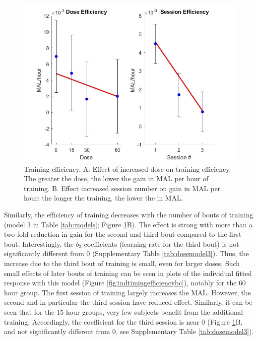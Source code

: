 \begin{figure}
	\centering
	\includegraphics[width=0.7\linewidth]{figures/doseEfficiency}
	\caption[Training efficiency.]{Training efficiency. 
		A. Effect of increased dose on training efficiency. The greater the dose, the lower the gain in MAL per hour of training. 
		B. Effect increased session number on gain in MAL per hour: the longer the training, the lower the in MAL.}
	\label{fig:doseefficiency}
\end{figure}


Similarly, the efficiency of training decreases with the number of bouts of training (model 3 in Table \ref{tab:models}; Figure \ref{fig:doseefficiency}B). 
The effect is strong with more than a two-fold reduction in gain for the second and third bout compared to the first bout. 
Interestingly, the $ b_3 $ coefficients (learning rate for the third bout) is not significantly different from 0 (Supplementary Table \ref{tab:dosemodel3}). 
Thus, the increase due to the third bout of training is small, even for larger doses. 
Such small effects of later bouts of training can be seen in plots of the individual fitted response with this model (Figure \ref{fig:indtimingefficiencybc}), notably for the 60 hour group. 
The first session of training largely increases the MAL. 
However, the second and in particular the third session have reduced effect. 
Similarly, it can be seen that for the 15 hour groups, very few subjects benefit from the additional training. 
Accordingly, the coefficient for the third session is near 0 (Figure \ref{fig:doseefficiency}B, and not significantly different from 0, see Supplementary Table \ref{tab:dosemodel3}).


